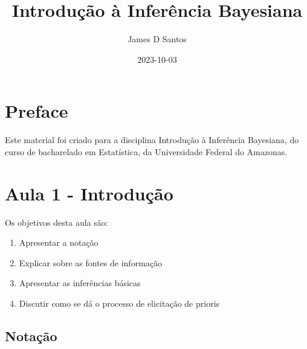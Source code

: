 \documentclass[
  letterpaper,
  DIV=11,
  numbers=noendperiod]{scrreprt}
\title{Introdução à Inferência Bayesiana}
\author{James D Santos}
\date{2023-10-03}
\providecommand{\tightlist}{%
  \setlength{\itemsep}{0pt}\setlength{\parskip}{0pt}}\usepackage{longtable,booktabs,array}
\renewcommand*\contentsname{Table of contents}
\newcommand\contentsname{Table of contents}
\theoremstyle{definition}
\theoremstyle{definition}
\theoremstyle{remark}
\begin{document}
\maketitle
\ifdefined\Shaded\renewenvironment{Shaded}{\begin{tcolorbox}[frame hidden, enhanced, sharp corners, borderline west={3pt}{0pt}{shadecolor}, boxrule=0pt, breakable, interior hidden]}{\end{tcolorbox}}\fi

\renewcommand*\contentsname{Table of contents}
{
\hypersetup{linkcolor=}
\setcounter{tocdepth}{2}
\tableofcontents
}

\hypertarget{preface}{%
\chapter*{Preface}\label{preface}}


Este material foi criado para a disciplina Introdução à Inferência
Bayesiana, do curso de bacharelado em Estatística, da Universidade
Federal do Amazonas.


\hypertarget{section}{%
\chapter{}\label{section}}


\hypertarget{aula-1---introduuxe7uxe3o}{%
\chapter{Aula 1 - Introdução}\label{aula-1---introduuxe7uxe3o}}

Os objetivos desta aula são:

\begin{enumerate}
\def\labelenumi{\arabic{enumi}.}
\tightlist
\item
  Apresentar a notação
\item
  Explicar sobre as fontes de informação
\item
  Apresentar as inferências básicas
\item
  Discutir como se dá o processo de elicitação de prioris
\end{enumerate}

\hypertarget{notauxe7uxe3o}{%
\section{Notação}\label{notauxe7uxe3o}}
\end{document}
